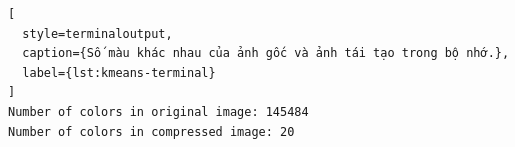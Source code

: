 

\begin{lstlisting}[
  style=terminaloutput,
  caption={Số màu khác nhau của ảnh gốc và ảnh tái tạo trong bộ nhớ.},
  label={lst:kmeans-terminal}
]
Number of colors in original image: 145484
Number of colors in compressed image: 20
\end{lstlisting}
